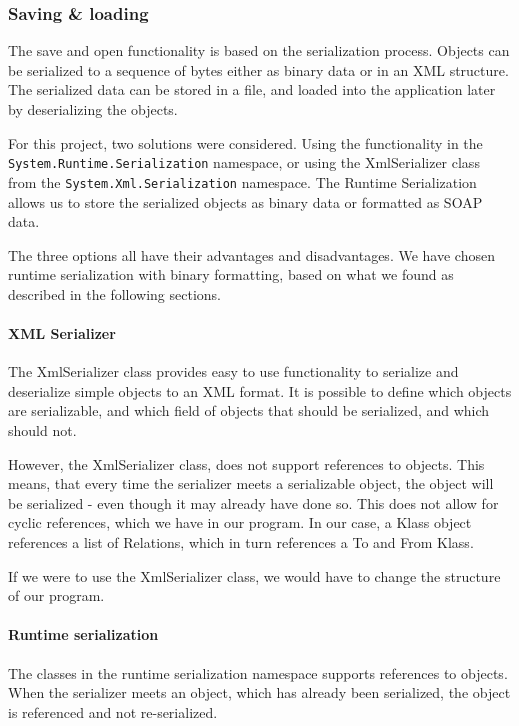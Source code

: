 \subsubsection{Saving \& loading}
The save and open functionality is based on the serialization process. Objects
can be serialized to a sequence of bytes either as binary data or in an XML
structure. The serialized data can be stored in a file, and loaded into the
application later by deserializing the objects.

For this project, two solutions were considered. Using the functionality in the
\texttt{System.Runtime.Serialization} namespace, or using the XmlSerializer
class from the \texttt{System.Xml.Serialization} namespace. The Runtime
Serialization allows us to store the serialized objects as binary data or
formatted as SOAP data.

The three options all have their advantages and disadvantages. We have chosen
runtime serialization with binary formatting, based on what we found as
described in the following sections.

\paragraph{XML Serializer}

The XmlSerializer class provides easy to use
functionality to serialize and deserialize simple objects to an XML format. It
is possible to define which objects are serializable, and which field of objects
that should be serialized, and which should not.

However, the XmlSerializer class, does not support references to objects. This
means, that every time the serializer meets a serializable object, the object
will be serialized - even though it may already have done so. This does not
allow for cyclic references, which we have in our program. In our case, a Klass
object references a list of Relations, which in turn references a To and From
Klass.

If we were to use the XmlSerializer class, we would have to change the structure
of our program.

\paragraph{Runtime serialization}

The classes in the runtime serialization
namespace supports references to objects. When the serializer meets an object,
which has already been serialized, the object is referenced and not
re-serialized.

